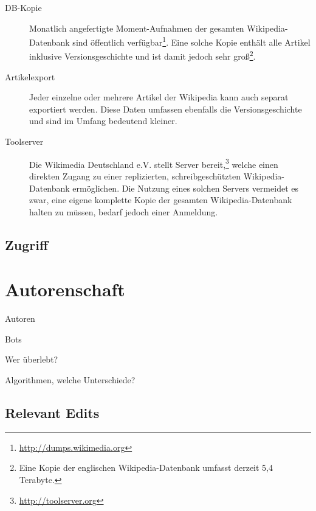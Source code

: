 \begin{description}
\item[DB-Kopie] Monatlich angefertigte Moment-Aufnahmen der gesamten Wikipedia-Datenbank sind öffentlich verfügbar\footnote{\url{http://dumps.wikimedia.org}}. Eine solche Kopie enthält alle Artikel inklusive Versionsgeschichte und ist damit jedoch sehr groß\footnote{Eine Kopie der englischen Wikipedia-Datenbank umfasst derzeit 5,4 Terabyte.}.
\item[Artikelexport] Jeder einzelne oder mehrere Artikel der Wikipedia kann auch separat exportiert werden. Diese Daten umfassen ebenfalls die Versionsgeschichte und sind im Umfang bedeutend kleiner.
\item[Toolserver] Die Wikimedia Deutschland e.V. stellt Server bereit,\footnote{\url{http://toolserver.org}} welche einen direkten Zugang zu einer replizierten, schreibgeschützten Wikipedia-Datenbank ermöglichen. Die Nutzung eines solchen Servers vermeidet es zwar, eine eigene komplette Kopie der gesamten Wikipedia-Datenbank halten zu müssen, bedarf jedoch einer Anmeldung.
\end{description}

\subsection{Zugriff}



\section{Autorenschaft}


\begin{todos}
    \item Autoren
    \item Bots
    \item Wer überlebt?
    \item Algorithmen, welche Unterschiede?
\end{todos}

\subsection{Relevant Edits}




